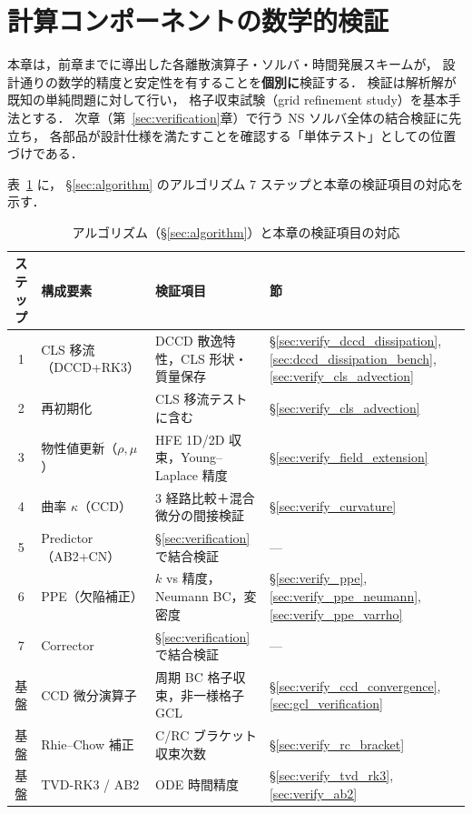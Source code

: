 \section{計算コンポーネントの数学的検証}
\label{sec:numerical_integrity}%
\label{sec:impl_collocate}%

本章は，前章までに導出した各離散演算子・ソルバ・時間発展スキームが，
設計通りの数学的精度と安定性を有することを\textbf{個別に}検証する．
検証は解析解が既知の単純問題に対して行い，
格子収束試験（grid refinement study）を基本手法とする．
次章（第~\ref{sec:verification}章）で行う NS ソルバ全体の結合検証に先立ち，
各部品が設計仕様を満たすことを確認する「単体テスト」としての位置づけである．

表~\ref{tab:component_algorithm_map} に，
§\ref{sec:algorithm} のアルゴリズム 7 ステップと本章の検証項目の対応を示す．

\begin{table}[htbp]
\centering
\caption{アルゴリズム（§\ref{sec:algorithm}）と本章の検証項目の対応}
\label{tab:component_algorithm_map}
\renewcommand{\arraystretch}{1.3}
\small
\begin{tabular}{clp{4.2cm}p{4.0cm}}
\toprule
ステップ & 構成要素 & 検証項目 & 節 \\
\midrule
1 & CLS 移流（DCCD+RK3） & DCCD 散逸特性，CLS 形状・質量保存 & §\ref{sec:verify_dccd_dissipation}, \ref{sec:dccd_dissipation_bench}, \ref{sec:verify_cls_advection} \\
2 & 再初期化 & CLS 移流テストに含む & §\ref{sec:verify_cls_advection} \\
3 & 物性値更新（$\rho, \mu$） & HFE 1D/2D 収束，Young--Laplace 精度 & §\ref{sec:verify_field_extension} \\
4 & 曲率 $\kappa$（CCD） & 3 経路比較＋混合微分の間接検証 & §\ref{sec:verify_curvature} \\
5 & Predictor（AB2+CN） & §\ref{sec:verification} で結合検証 & — \\
6 & PPE（欠陥補正） & $k$ vs 精度，Neumann BC，変密度 & §\ref{sec:verify_ppe}, \ref{sec:verify_ppe_neumann}, \ref{sec:verify_ppe_varrho} \\
7 & Corrector & §\ref{sec:verification} で結合検証 & — \\
\midrule
基盤 & CCD 微分演算子 & 周期 BC 格子収束，非一様格子 GCL & §\ref{sec:verify_ccd_convergence}, \ref{sec:gcl_verification} \\
基盤 & Rhie--Chow 補正 & C/RC ブラケット収束次数 & §\ref{sec:verify_rc_bracket} \\
基盤 & TVD-RK3 / AB2 & ODE 時間精度 & §\ref{sec:verify_tvd_rk3}, \ref{sec:verify_ab2} \\
\bottomrule
\end{tabular}
\end{table}

